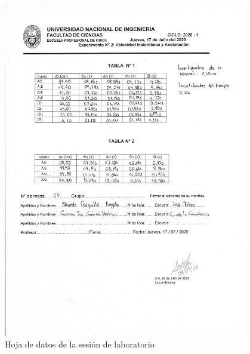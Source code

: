 \documentclass[../main]{subfiles}
\begin{document}
\begin{figure}[H]
  \begin{center}
    \includegraphics[width=0.95\textwidth]{res/lab_data.png}
  \end{center}
  \caption{Hoja de datos de la sesión de laboratorio}\label{fig:lab_data}
\end{figure}
\end{document}
